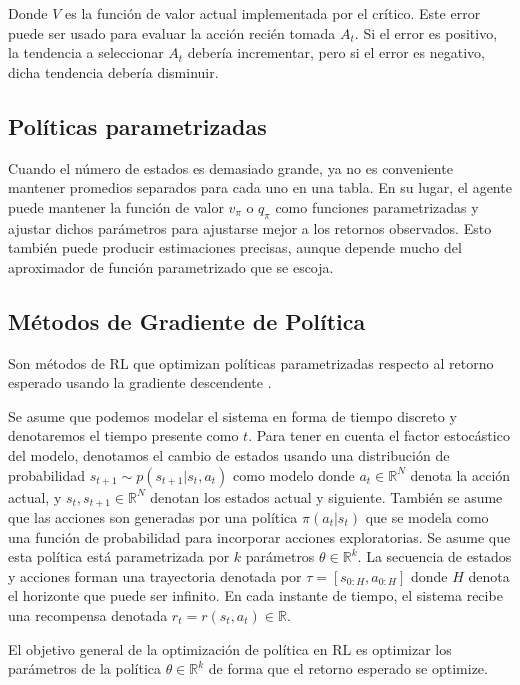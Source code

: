 Donde $V$ es la función de valor actual implementada por el crítico. Este error puede ser usado para evaluar la acción recién tomada $A_t$. Si el error es positivo, la tendencia a seleccionar $A_t$ debería incrementar, pero si el error es negativo, dicha tendencia debería disminuir.


\subsection{Políticas parametrizadas}

Cuando el número de estados es demasiado grande, ya no es conveniente mantener promedios separados para cada uno en una tabla. En su lugar, el agente puede mantener la función de valor $v_\pi$ o $q_\pi$ como funciones parametrizadas y ajustar dichos parámetros para ajustarse mejor a los retornos observados. Esto también puede producir estimaciones precisas, aunque depende mucho del aproximador de función parametrizado que se escoja.


\subsection{Métodos de Gradiente de Política}

Son métodos de \ac{RL} que optimizan políticas parametrizadas respecto al retorno esperado usando la gradiente descendente \cite{sutton1999policy}.

Se asume que podemos modelar el sistema en forma de tiempo discreto y denotaremos el tiempo presente como $t$. Para tener en cuenta el factor estocástico del modelo, denotamos el cambio de estados usando una distribución de probabilidad $s_{t+1} \sim p(s_{t+1}|s_t, a_t)$ como modelo donde $a_t \in \mathbb{R}^N$ denota la acción actual, y $s_t, s_{t+1} \in \mathbb{R}^N$ denotan los estados actual y siguiente. También se asume que las acciones son generadas por una política $\pi(a_t|s_t)$ que se modela como una función de probabilidad para incorporar acciones exploratorias. Se asume que esta política está parametrizada por $k$ parámetros $\theta \in \mathbb{R}^k$. La secuencia de estados y acciones forman una trayectoria denotada por $\tau = [s_{0:H}, a_{0:H}]$ donde $H$ denota el horizonte que puede ser infinito. En cada instante de tiempo, el sistema recibe una recompensa denotada $r_t = r(s_t, a_t) \in \mathbb{R}$.

El objetivo general de la optimización de política en \ac{RL} es optimizar los parámetros de la política $\theta \in \mathbb{R}^k$ de forma que el retorno esperado se optimize.

